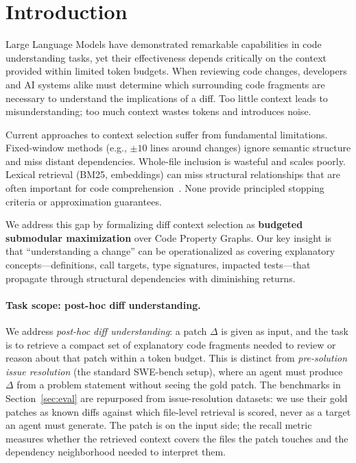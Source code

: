 \documentclass[11pt, a4paper]{article}
\begin{document}
\begin{abstract}
\end{abstract}

\newpage
\section{Introduction}

Large Language Models have demonstrated remarkable capabilities in code understanding tasks, yet their effectiveness depends critically on the context provided within limited token budgets. When reviewing code changes, developers and AI systems alike must determine which surrounding code fragments are necessary to understand the implications of a diff. Too little context leads to misunderstanding; too much context wastes tokens and introduces noise.

Current approaches to context selection suffer from fundamental limitations. Fixed-window methods (e.g., $\pm 10$ lines around changes) ignore semantic structure and miss distant dependencies. Whole-file inclusion is wasteful and scales poorly. Lexical retrieval (BM25, embeddings) can miss structural relationships that are often important for code comprehension~\cite{ko2006exploratory, robillard2004effective}. None provide principled stopping criteria or approximation guarantees.

We address this gap by formalizing diff context selection as \textbf{budgeted submodular maximization} over Code Property Graphs. Our key insight is that ``understanding a change'' can be operationalized as covering explanatory concepts---definitions, call targets, type signatures, impacted tests---that propagate through structural dependencies with diminishing returns.

\paragraph{Task scope: post-hoc diff understanding.} We address \emph{post-hoc diff understanding}: a patch $\Delta$ is given as input, and the task is to retrieve a compact set of explanatory code fragments needed to review or reason about that patch within a token budget. This is distinct from \emph{pre-solution issue resolution} (the standard SWE-bench setup), where an agent must produce $\Delta$ from a problem statement without seeing the gold patch. The benchmarks in Section~\ref{sec:eval} are repurposed from issue-resolution datasets: we use their gold patches as known diffs against which file-level retrieval is scored, never as a target an agent must generate. The patch is on the input side; the recall metric measures whether the retrieved context covers the files the patch touches and the dependency neighborhood needed to interpret them.
\end{document}
